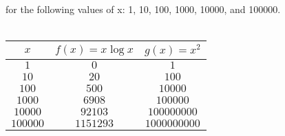 \documentclass[11pt]{article}
\begin{document}
\begin{enumerate}
\begin{enumerate}
for the following values of x: 1, 10, 100, 1000, 10000, and 100000.
\\
\\
\begin{center}
\begin{tabular}{|c|c|c|}
\hline
\textbf{$x$} & \textbf{$f(x)=x \log x$} & \textbf{$g(x)=x^2$}  \\
\hline
$1$          & $0$          & $1$       \\
$10$        & $20$        & $100$        \\
$100$ 		&$500$&$10000$\\
$1000$&$6908$&$100000$\\
$10000$&$92103$&$100000000$\\
$100000$&$1151293$&$1000000000$\\
\hline

\end{tabular}
\end{center}
\end{enumerate}

\end{enumerate}
\end{document}
